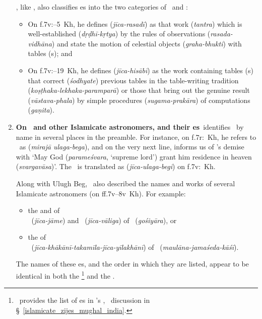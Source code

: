 \begin{enumerate}[topsep=0pt]
    \Nityananda, like \MullaFarid, also classifies \zij es into the two categories of \zijiRasadi\ and \zijiHisabi: 
    \begin{itemize}
            \item On f.\thinspace 7v:--5~Kh, he defines  (\textit{jīca-rasadī}) as that work (\textit{tantra}) which is well-established (\textit{dṛḍhī-kṛtya}) by the rules of observations (\textit{rasada-vidhāna}) and state the motion of celestial objects (\textit{graha-bhukti}) with tables (\kosthaka s); and
            \item On f.\thinspace 7v:--19~Kh, he defines  (\textit{jīca-hisābī}) as the work containing tables (\kosthaka s) that correct (\textit{śodhyate}) previous tables in the table-writing tradition (\textit{koṣṭhaka-lekhaka-paramparā}) or those that bring out the genuine result (\textit{vāstava-phala}) by simple procedures (\textit{sugama-prakāra}) of computations (\textit{gaṇita}). 
        \end{itemize}

     \item \textbf{On \UlughBeg\ and other Islamicate astronomers, and their \zij es}\label{ulugh_beg_others_zijes_siddhantasindhu}\quad   \Nityananda\ identifies \UlughBeg\ by name in several places in the preamble. For instance, on f.\thinspace 7r:~Kh, he refers to \UlughBeg\ as  (\textit{mirajā ulaga-bega}), and on the very next line, informs us of \UlughBeg's demise with  `May God (\textit{parameśvara}, \lit `supreme lord') grant him residence in heaven (\textit{svargavāsa})'. The \ZijUlughBeg\ is translated as  (\textit{jīca-ulaga-begi}) on f.\thinspace 7v:~Kh.
     
    Along with Ulugh Beg, \Nityananda\ also described the names and works of several Islamicate astronomers (on ff.\thinspace 7v--8v~Kh). For example:
     \begin{itemize}
         \item the  and  of  \\
         \alZijalJami\ (\textit{jīca-jāme}) and \alZijalBaligh\ (\textit{jīca-vāliga}) of \Gilanifull\ (\textit{gośiyāra}), or
         \item the  
    of  \\
    \KhaqaniZijfull\ (\textit{jīca-khākānī-takamīla-jīca-yīlakhānī}) of \alKashifull\ (\textit{maulāna-jamaśeda-kāśī}).
     \end{itemize}
     The names of these \zij es, and the order in which they are listed, appear to be identical in both the \ZijiShahJahani\thinspace\footnote{\,\textcite[48]{Ghori} provides the list of \zij es in \MullaFarid's \ZijiShahJahani, \vid\ discussion in \S~\ref{islamicate_zijes_mughal_india}.}  and the \Siddhantasindhu.
    \end{enumerate}

